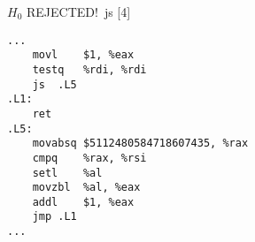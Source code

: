 \begin{figure}[H]
\begin{subfigure}[T]{0.30333333333333334\textwidth}
\begin{lrbox}{\mybox}
%
        \end{lrbox}\resizebox{\textwidth}{!}{\usebox{\mybox}}
\end{subfigure}
\begin{subfigure}[T]{0.30333333333333334\textwidth}
\caption*{}
\end{subfigure}
\begin{subfigure}[T]{0.30333333333333334\textwidth}
\caption*{}
\end{subfigure}
\hspace*{6mm}
\begin{subfigure}[T]{0.2733333333333333\textwidth}
\vspace*{2mm}\tiny {\color{red}$H_0$ REJECTED!}\ \vspace*{2mm}\tiny js [4]
\begin{lstlisting}[style=defstyle,language={[x86masm]Assembler},basicstyle=\tiny\ttfamily,breaklines=true]
...
	movl	$1, %eax
	testq	%rdi, %rdi
	js	.L5
.L1:
	ret
.L5:
	movabsq	$5112480584718607435, %rax
	cmpq	%rax, %rsi
	setl	%al
	movzbl	%al, %eax
	addl	$1, %eax
	jmp	.L1
...\end{lstlisting}
\end{subfigure}
\end{figure}
\newpage\noindent